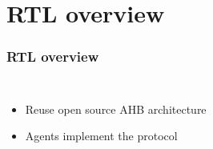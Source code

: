 \documentclass[]{beamer}
\begin{document}
\section{RTL overview}
         \begin{frame}
           \frametitle{RTL overview}
           \begin{columns}
             \begin{itemize}
             \item<1-> Reuse open source AHB architecture
             \item<2-> Agents implement the protocol
             \end{itemize}
             \centering

\end{columns}
\end{frame}
\end{document}
